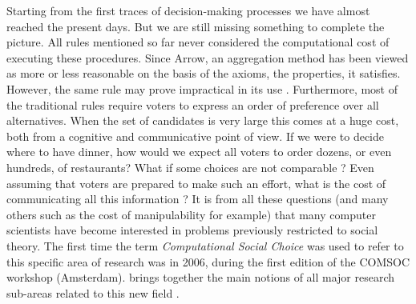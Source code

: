 Starting from the first traces of decision-making processes we have almost reached the present days. But we are still missing something to complete the picture. All rules mentioned so far never considered the computational cost of executing these procedures.
Since Arrow, an aggregation method has been viewed as more or less reasonable on the basis of the axioms, the properties, it satisfies. However, the same rule may prove impractical in its use \citep{Bartholdi1989,Rothe2003,Hemaspaandra2005,Davenport2004}.
Furthermore, most of the traditional rules require voters to express an order of preference over all alternatives. When the set of candidates is very large this comes at a huge cost, both from a cognitive and communicative point of view.
If we were to decide where to have dinner, how would we expect all voters to order dozens, or even hundreds, of restaurants? What if some choices are not comparable \citep{Pini2007}? 
Even assuming that voters are prepared to make such an effort, what is the cost of communicating all this information \citep{Lang2004,Conitzer2005}?
It is from all these questions (and many others such as the cost of manipulability for example) that many computer scientists have become interested in problems previously restricted to social theory.
The first time the term \textit{Computational Social Choice} was used to refer to this specific area of research was in 2006, during the first edition of the COMSOC workshop (Amsterdam).
\textit{} brings together the main notions of all major research sub-areas related to this new field \citep{Comsoc2016}.

